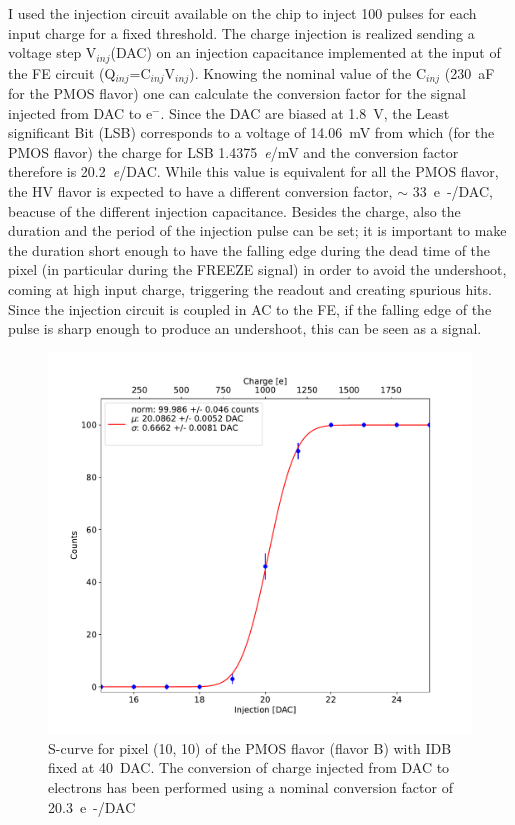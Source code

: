         I used the injection circuit available on the chip to inject 100 pulses for each input charge for a fixed threshold.
        The charge injection is realized sending a voltage step V$_{inj}$(DAC) on an injection capacitance implemented at the input of the FE circuit (Q$_{inj}$=C$_{inj}$V$_{inj}$). Knowing the nominal value of the C$_{inj}$ (\SI{230}{aF} for the PMOS flavor) one can calculate the conversion factor for the signal injected from DAC to e$^-$. 
        Since the DAC are biased at \SI{1.8}{V}, the Least significant Bit (LSB) corresponds to a voltage of \SI{14.06}{mV} from which (for the PMOS flavor) the charge for LSB \SI{1.4375}{\elementarycharge/mV} and the conversion factor therefore is \SI{20.2}{\elementarycharge/DAC}.     
        While this value is equivalent for all the PMOS flavor, the HV flavor is expected to have a different conversion factor, $\sim$ \SI{33}{e-/DAC}, beacuse of the different injection capacitance. 
        Besides the charge, also the duration and the period of the injection pulse can be set; it is important to make the duration short enough to have the falling edge during the dead time of the pixel (in particular during the FREEZE signal) in order to avoid the undershoot, coming at high input charge, triggering the readout and creating spurious hits. 
        Since the injection circuit is coupled in AC to the FE, if the falling edge of the pulse is sharp enough to produce an undershoot, this can be seen as a signal. 

        \begin{figure}
            \centering
            \includegraphics[width=.6\linewidth]{figures/charaterization/scurve.pdf}
            \caption{S-curve for pixel (10, 10) of the PMOS flavor (flavor B) with IDB fixed at \SI{40}{DAC}. The conversion of charge injected from DAC to electrons has been performed using a nominal conversion factor of \SI{20.3}{e-/DAC} }
            \label{fig:scurve}
        \end{figure}   

